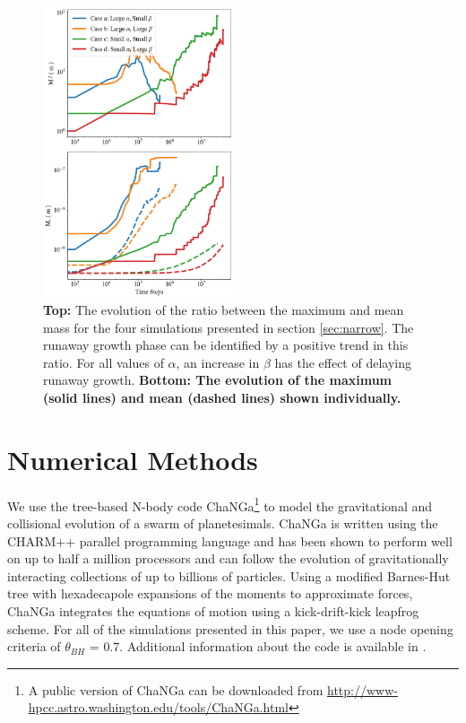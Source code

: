\documentclass[twocolumn,linenumbers]{aastex63}
\begin{document}
\begin{figure}
\begin{center}
    \includegraphics[width=0.5\textwidth]{figures/alpha_beta_evo.png}
    \caption{\textbf{Top:} The evolution of the ratio between the maximum and mean mass for the four simulations presented
    in section \ref{sec:narrow}. The runaway growth phase can be identified by a positive trend in this ratio. For all values of 
    $\alpha$, an increase in $\beta$ has the effect of delaying runaway growth. \textbf{Bottom: The evolution of the maximum
    (solid lines) and mean (dashed lines) shown individually.}\label{fig:alpha_beta_evo}}
\end{center}
\end{figure}

\section{Numerical Methods}\label{sec:methods}

We use the tree-based N-body code {\sc ChaNGa}\footnote{A public version of {\sc ChaNGa} can be downloaded from \url{http://www-hpcc.astro.washington.edu/tools/ChaNGa.html}} to model the gravitational and collisional evolution of a swarm of planetesimals. {\sc ChaNGa} is written using the {\sc CHARM++} parallel programming language and has been shown to perform well on up to half a million processors \citep{menon15} and can follow the evolution of gravitationally interacting collections of up to billions of particles. Using a modified Barnes-Hut tree with hexadecapole expansions of the moments to approximate forces, {\sc ChaNGa} integrates the equations of motion using a kick-drift-kick leapfrog scheme. For all of the simulations presented in this paper, we use a node opening criteria of $\theta_{BH}$ = 0.7. Additional information about the code is available in \citep{jetley08,menon15}.
\end{document}
